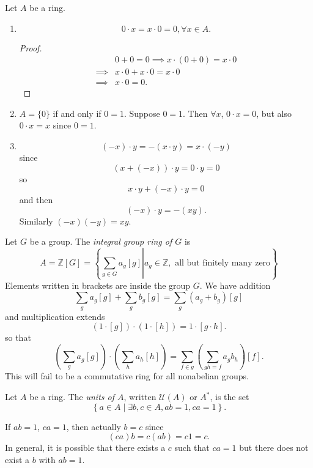 \begin{obsv}
Let $A$ be a ring.
\begin{enumerate}
\item{
  $$
  0 \cdot x = x \cdot 0 = 0, \forall x \in A.
  $$
  \begin{proof}
  \begin{align*}
             & 0 + 0 = 0 \implies x \cdot (0 + 0) = x \cdot 0 \\
    \implies & x \cdot 0 + x \cdot 0 = x \cdot 0 \\
    \implies & x \cdot 0 = 0.
  \end{align*}
  \end{proof}
}
\item{
  $A = \{ 0 \}$ if and only if $0 = 1$. Suppose $0 = 1$. Then
  $\forall x$, $0 \cdot x = 0$, but also $0 \cdot x = x$ since $0 =
  1$.
}
\item{
  $$
  (-x) \cdot y = -(x \cdot y) = x \cdot (-y)
  $$
  since
  $$
  (x + (-x)) \cdot y = 0 \cdot y = 0
  $$
  so
  $$
  x \cdot y + (-x) \cdot y = 0
  $$
  and then
  $$
  (-x) \cdot y = -(xy).
  $$
  Similarly $(-x)(-y) = xy$.
}
\end{enumerate}
\end{obsv}

\begin{xmpl}
Let $G$ be a group. The \emph{integral group ring of $G$} is
$$
A = \mathbb{Z} [G]
  = \left\{ \left. \sum_{g \in G} a_g [g] \right|
            a_g \in \mathbb{Z}, \text{ all but finitely many zero}
    \right\}
$$
Elements written in brackets are inside the group $G$.
We have addition
$$
\sum_{g} a_g [g] + \sum_{g} b_g [g] = \sum_{g} (a_g + b_g)[g]
$$
and multiplication extends
$$
(1 \cdot [g]) \cdot (1 \cdot [h]) = 1 \cdot [g \cdot h].
$$
so that
$$
\left(\sum_g a_g [g]\right)
\cdot
\left(\sum_h a_h [h]\right)
=
\sum_{f \in g}
\left(\sum_{gh = f} a_g b_h \right)[f].
$$
This will fail to be a commutative ring for all nonabelian groups.
\end{xmpl}

\begin{defn}
Let $A$ be a ring. The \emph{units of $A$}, written $\mathcal{U}(A)$
or $A^\ast$, is the set
$$
\left\{ a \in A \mid \exists b, c \in A, a b = 1, c a = 1 \right\}.
$$

\begin{remark}
If $a b = 1$, $c a = 1$, then actually $b = c$ since
$$
(c a)b = c (a b) = c 1 = c.
$$
In general, it is possible that there exists a $c$ such that $c a = 1$
but there does not exist a $b$ with $a b = 1$.
\end{remark}
\end{defn}

